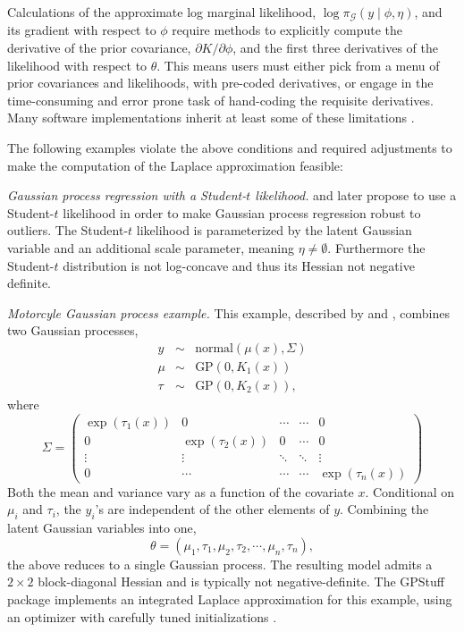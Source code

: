 \documentclass[stslayout, noinfoline]{imsart}
\theoremstyle{definition}
\begin{document}
Calculations of the approximate log marginal likelihood, $\log \pi_\mathcal{G}(y \mid \phi, \eta)$, and its gradient with respect to $\phi$ require methods to explicitly compute the derivative of the prior covariance, $\partial K / \partial \phi$,
and the first three derivatives of the likelihood with respect to $\theta$.
This means users must either pick from a menu of prior covariances and likelihoods,
with pre-coded derivatives, or engage in the time-consuming and error prone task of hand-coding the requisite derivatives.
Many software implementations inherit at least some of these limitations \citep[e.g][]{Vanhatalo:2013, Rue:2017, Margossian:2020-laplace}.

The following examples violate the above conditions and required adjustments to make the computation of the Laplace approximation feasible:

\noindent
\textit{Gaussian process regression with a Student-$t$ likelihood.} 
\citet{Vanhatalo:2009} and later \citet{Jylanki:2011} propose to use a Student-$t$ likelihood in order to make Gaussian process regression robust to outliers.
The Student-$t$ likelihood is parameterized by the latent Gaussian variable and an additional scale parameter, meaning $\eta \neq \emptyset$.
Furthermore the Student-$t$ distribution is not log-concave and thus its Hessian not  negative definite.

\noindent
\textit{Motorcyle Gaussian process example.}
This example, described by \citet{Tolvanen:2014} and \citet{Vehtari:2021}, combines two Gaussian processes,
\begin{eqnarray*}
  y & \sim & \text{normal}(\mu(x), \Sigma) \\
  \mu & \sim & \text{GP}(0, K_1(x)) \\
  \tau & \sim & \text{GP}(0, K_2(x)),
\end{eqnarray*}
%
where
\begin{equation*}
  \Sigma = \begin{pmatrix}
  \exp(\tau_1(x)) & 0 & \cdots  & \cdots & 0 \\
  0 & \exp(\tau_2(x)) & 0 & \cdots & 0 \\
  \vdots & \vdots & \ddots & \ddots & \vdots \\
  0 & \cdots & \cdots & \cdots & \exp(\tau_n(x))
  \end{pmatrix}
\end{equation*}
Both the mean and variance vary as a function of the covariate $x$.
Conditional on $\mu_i$ and $\tau_i$, the $y_i$'s are independent of the other elements of $y$.
Combining the latent Gaussian variables into one,
\begin{equation*}
  \theta = (\mu_1, \tau_1, \mu_2, \tau_2, \cdots, \mu_n, \tau_n),
\end{equation*}
%
the above reduces to a single Gaussian process.
The resulting model admits a $2 \times 2$ block-diagonal Hessian
and is typically not negative-definite.
The GPStuff package implements an integrated Laplace approximation for this example, using an optimizer with carefully tuned initializations \citep{Vanhatalo:2013}.
\end{document}
